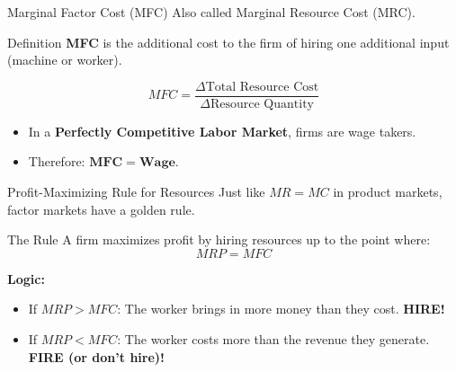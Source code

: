 \documentclass[aspectratio=169]{beamer}
\begin{document}
\begin{frame}{Marginal Factor Cost (MFC)}
    Also called Marginal Resource Cost (MRC).
    
    \begin{block}{Definition}
        \textbf{MFC} is the additional cost to the firm of hiring one additional input (machine or worker).
    \end{block}

    \begin{equation*}
        MFC = \frac{\Delta \text{Total Resource Cost}}{\Delta \text{Resource Quantity}}
    \end{equation*}

    \begin{itemize}
        \item In a \textbf{Perfectly Competitive Labor Market}, firms are wage takers.
        \item Therefore: $\mathbf{MFC = Wage}$.
    \end{itemize}
\end{frame}

\begin{frame}{Profit-Maximizing Rule for Resources}
    Just like $MR=MC$ in product markets, factor markets have a golden rule.
    
    \begin{alertblock}{The Rule}
        A firm maximizes profit by hiring resources up to the point where:
        \Huge
        \[ MRP = MFC \]
        \normalsize
    \end{alertblock}
    
    \vspace{0.3cm}
    \textbf{Logic:}
    \begin{itemize}
        \item If $MRP > MFC$: The worker brings in more money than they cost. \textbf{HIRE!}
        \item If $MRP < MFC$: The worker costs more than the revenue they generate. \textbf{FIRE (or don't hire)!}
    \end{itemize}
\end{frame}
\end{document}
